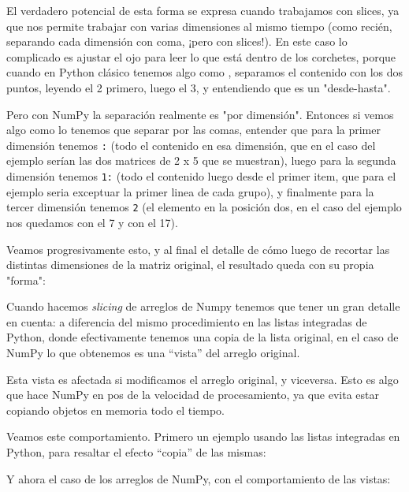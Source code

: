 
El verdadero potencial de esta forma se expresa cuando trabajamos con slices, ya que nos permite trabajar con varias dimensiones al mismo tiempo (como recién, separando cada dimensión con coma, ¡pero con slices!). En este caso lo complicado es ajustar el ojo para leer lo que está dentro de los corchetes, porque cuando en Python clásico tenemos algo como \mip{[2:5]}, separamos el contenido con los dos puntos, leyendo el 2 primero, luego el 3, y entendiendo que es un "desde-hasta".

Pero con NumPy la separación realmente es "por dimensión". Entonces si vemos algo como  lo tenemos que separar por las comas, entender que para la primer dimensión tenemos \texttt{:} (todo el contenido en esa dimensión, que en el caso del ejemplo serían las dos matrices de 2 x 5 que se muestran), luego para la segunda dimensión tenemos \texttt{1:} (todo el contenido luego desde el primer item, que para el ejemplo seria exceptuar la primer linea de cada grupo), y finalmente para la tercer dimensión tenemos \texttt{2} (el elemento en la posición dos, en el caso del ejemplo nos quedamos con el 7 y con el 17).

Veamos progresivamente esto, y al final el detalle de cómo luego de recortar las distintas dimensiones de la matriz original, el resultado queda con su propia "forma":


Cuando hacemos \textit{slicing} de arreglos de Numpy tenemos que tener un gran detalle en cuenta: a diferencia del mismo procedimiento en las listas integradas de Python, donde efectivamente tenemos una copia de la lista original, en el caso de NumPy lo que obtenemos es una ``vista'' del arreglo original. 

Esta vista es afectada si modificamos el arreglo original, y viceversa. Esto es algo que hace NumPy en pos de la velocidad de procesamiento, ya que evita estar copiando objetos en memoria todo el tiempo.

Veamos este comportamiento. Primero un ejemplo usando las listas integradas en Python, para resaltar el efecto ``copia'' de las mismas:


Y ahora el caso de los arreglos de NumPy, con el comportamiento de las vistas:



